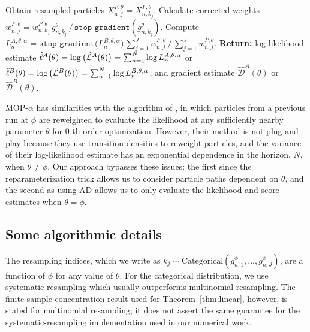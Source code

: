 \documentclass[11pt]{article}
\begin{document}
\begin{algorithm}[htbp!]
            \hspace*{4mm} Obtain resampled particles ${X}_{n,j}^{F,\theta}={X}_{n,k_{j}}^{P,\theta}$. \newline
            \hspace*{4mm} Calculate corrected weights
            $w_{n,j}^{F,\theta}= w^{P,\theta}_{n,k_j} \, g^{\theta}_{n,k_j} \, \big/ \, { \mathtt{stop\_gradient}(g^{\theta}_{n,k_j})}$.\newline
            \hspace*{4mm} Compute $ L_n^{A,\theta,\alpha} = \mathtt{stop\_gradient}\big(L_n^{B,\theta,\alpha}\big)\, {\sum_{j=1}^J w^{F,\theta}_{n,j}} \, \big/ \, {\sum_{j=1}^J  w^{P,\theta}_{n,j}}$.\newline
	    \textbf{Return:} log-likelihood estimate $\hat{\ell}^A(\theta)= \log\big(\hat{\mathcal{L}}^A(\theta)\big) = \sum_{n=1}^N \log L_n^{A,\theta,\alpha}$ or $\hat{\ell}^B(\theta)=\log\big(\hat{\mathcal{L}}^B(\theta)\big) = \sum_{n=1}^N \log L_n^{B,\theta,\alpha}$, and gradient estimate $\hat{\mathcal{D}}^A(\theta)$ or $\hat{\mathcal{D}}^B(\theta)$.
\end{algorithm}

MOP-$\alpha$ has similarities with the algorithm of \cite{svensson18}, in which particles from a previous run at $\phi$ are reweighted to evaluate the likelihood at any sufficiently nearby parameter $\theta$ for $0$-th order optimization.
However, their method is not plug-and-play because they use transition densities to reweight particles, and the variance of their log-likelihood estimate has an exponential dependence in the horizon, $N$, when $\theta\neq\phi$.
Our approach bypasses these issues: the first since the reparameterization trick allows us to consider particle paths dependent on $\theta$, and the second as using AD allows us to only evaluate the likelihood and score estimates when $\theta=\phi$. 

\subsection{Some algorithmic details}

The resampling indices, which we write as $k_j \sim \text{Categorical}(g^{\phi}_{n,1},...,g^{\phi}_{n,J})$, are a function of $\phi$ for any value of $\theta$.
For the categorical distribution, we use systematic resampling \citep{arulampalam02,king16} which usually outperforms multinomial resampling.
The finite-sample concentration result used for Theorem~\ref{thm:linear},
however, is stated for multinomial resampling; it does not assert the same
guarantee for the systematic-resampling implementation used in our numerical
work.
\end{document}
